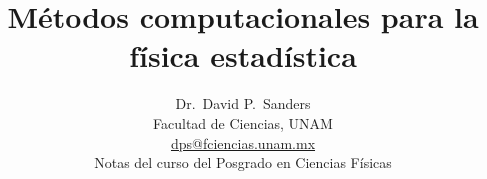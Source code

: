 \documentclass[10pt,twoside,openany, letterpaper]{book}
\begin{document}
\newcommand{\captionfonts}{\small}






\makeatletter  %
\long\def\@makecaption#1#2{%
  \begin{quotation}
  \vskip\abovecaptionskip
  \sbox\@tempboxa{{\captionfonts \noindent \textbf{#1}: #2}}%
  \ifdim \wd\@tempboxa >\hsize
    {\captionfonts \noindent \textbf{#1}: #2\par}
  \else
    \hbox to\hsize{\hfil\box\@tempboxa\hfil}%
  \fi
  \vskip\belowcaptionskip \end{quotation}}
\makeatother   %

\renewcommand{\figurename}{Fig.}



\title{\textbf{Métodos computacionales para la física estadística}}
\author{\Large Dr.~David P.~Sanders\\Facultad de Ciencias, UNAM\\
\url{dps@fciencias.unam.mx}\\[20pt]
Notas del curso del Posgrado en Ciencias Físicas 
}
\maketitle

 \setcounter{page}{1}

\let\v\verb

\let\inl\lstinline

\newcommand{\ejercicio}{\textbf{Ejercicio: }}

\renewcommand{\vec}[1]{\mathbf{#1}}
\newcommand{\xx}{\vec{x}}

\newcommand{\s}{\sigma}

\renewcommand{\ss}{\mathbf{\sigma}}
\newcommand{\defeq}{:=}
\newcommand{\mean}[1]{\left \langle #1 \right \rangle}

\newcommand{\dd}[2]{\frac{\partial #1}{\partial #2}}


\pagebreak
{}
\end{document}
